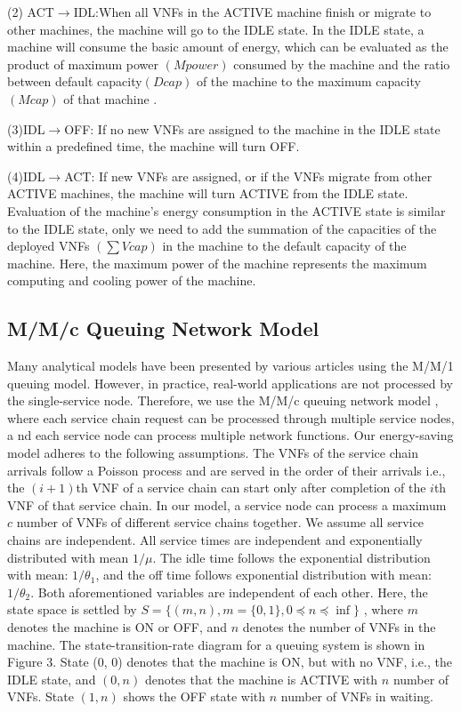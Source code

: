 \documentclass[12pt]{article}
\begin{document}
(2) ACT$\rightarrow$IDL:When all VNFs in the ACTIVE machine
finish or migrate to other machines, the machine will go to the
IDLE state. In the IDLE state, a machine will consume the
basic amount of energy, which can be evaluated as the product
of maximum power $(Mpower)$ consumed by the machine and
the ratio between default capacity$(Dcap)$ of the machine to
the maximum capacity $(Mcap)$ of that machine
.

(3)IDL$\rightarrow$OFF: If no new VNFs are assigned to the
machine in the IDLE state within a predefined time, the
machine will turn OFF.

(4)IDL$\rightarrow$ACT: If new VNFs are assigned, or if the VNFs
migrate from other ACTIVE machines, the machine will turn
ACTIVE from the IDLE state. Evaluation of the machine’s
energy consumption in the ACTIVE state is similar to the
IDLE state, only we need to add the summation of the
capacities of the deployed VNFs $(\sum Vcap)$ in the machine to
the  default capacity of the machine. Here, the maximum
power of the machine represents the maximum computing and
cooling power of the machine.
\subsection{M/M/c Queuing Network Model}
Many analytical models have been presented by various
articles using the M/M/1 queuing model.
However, in practice, real-world applications are not
processed by the single-service node. Therefore, we use the
M/M/c queuing network model , where each service
chain request can be processed through multiple service nodes,
a nd each service node can process multiple network functions.
Our energy-saving model adheres to the following
assumptions. The VNFs of the service chain arrivals follow a
Poisson process  and are served in the order of their arrivals
i.e., the $(i+ 1)$th VNF of a service chain can start only after
completion of the $i$th VNF of that service chain. In our model,
a service node can process a maximum $c$  number of VNFs of
different service chains together. We assume all service chains
are independent. All service times are independent and
exponentially distributed with mean $1/\mu$. The idle time follows
the exponential distribution with mean: $1/\theta_1$, and the off time
follows exponential distribution with mean: $1/\theta_2$. Both
aforementioned variables are independent of each other. Here,
the state space is settled by $S=\{(m, n), m = \{0,1\}, 0 \preceq n \preceq \inf \}$
, where $m$ denotes the machine is ON or OFF, and $n$ denotes
the number of VNFs in the machine. The state-transition-rate
diagram for a queuing system is shown in Figure 3. State (0, 0)
denotes that the machine is ON, but with no VNF, i.e., the
IDLE state, and $(0, n)$ denotes that the machine is ACTIVE
with $n$ number of VNFs. State $(1, n)$ shows the OFF state with
$n$ number of VNFs in waiting.
\end{document}
